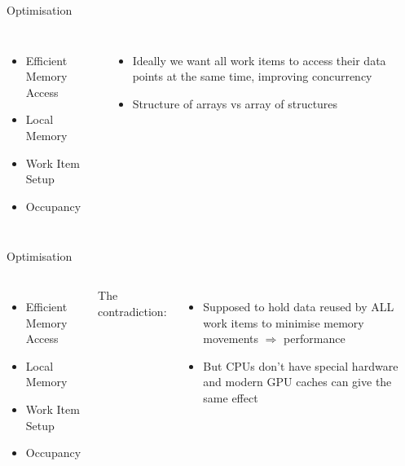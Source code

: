 \documentclass[10pt,aspectratio=169]{beamer} %
\newcommand{\hide}[1] {
	\textcolor{hiddencolor}{#1}
}
\begin{document}
\begin{frame}{Optimisation}

\begin{columns}[onlytextwidth]
\column{\dimexpr\linewidth-85mm-5mm}
\begin{itemize}
\item \alert{Efficient Memory Access}
\item \hide{Local Memory}
\item \hide{Work Item Setup}
\item \hide{Occupancy}
\end{itemize}

\column{85mm}
\large
\begin{itemize}
\item Ideally we want all work items to access their data points at the same time, improving concurrency
\item Structure of arrays vs array of structures
\end{itemize}

\end{columns}
  
\end{frame}

\begin{frame}{Optimisation}

\begin{columns}[onlytextwidth]
\column{\dimexpr\linewidth-85mm-5mm}
\begin{itemize}
\item \hide{Efficient Memory Access}
\item \alert{Local Memory}
\item \hide{Work Item Setup}
\item \hide{Occupancy}
\end{itemize}

\column{85mm}
\large
The contradiction:
\begin{itemize}
\item Supposed to hold data reused by ALL work items to minimise memory movements $\Rightarrow$ performance
\item \alert{But} CPUs don't have special hardware and modern GPU caches can give the same effect
\end{itemize}

\end{columns}
  
\end{frame}
\end{document}
